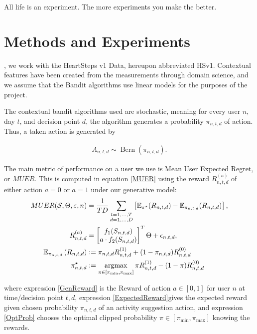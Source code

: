 \begin{savequote}[75mm]
All life is an experiment.  The more experiments you make the better.
\end{savequote}

\chapter{Methods and Experiments}
\label{Methods}

, we work with the HeartSteps v1 Data, hereupon abbreviated HSv1.  Contextual features have been created from the measurements through domain science, and we assume that the Bandit algorithms use linear models for the purposes of the project.

The contextual bandit algorithms used are stochastic, meaning for every user $n$, day $t$, and decision point $d$, the algorithm generates a probability $\pi_{n,t,d}$ of action.  Thus, a taken action is generated by

\begin{align*}
A_{n,t,d} \sim \operatorname{Bern}(\pi_{n,t,d}).
\end{align*}

The main metric of performance on a user we use is Mean User Expected Regret, or $MUER$. This is computed in equation \ref{MUER} using the reward $R^{(a)}_{n,t,d}$ of either action $a = 0$ or $a = 1$ under our generative model:
\begin{align}
\label{MUER}
MUER(\mathcal{S}, \Theta, \varepsilon,n) &= \frac{1}{TD} \sum_{\substack{t=1,\ldots,T \\ d=1,\ldots,D}} \left[\mathbb{E}_{\pi^\star} (R_{n,t,d}) - \mathbb{E}_{\pi_{n,t,d}} (R_{n,t,d}) \right],  \\
\label{GenReward}
R^{(a)}_{n,t,d} &= \begin{bmatrix} f_1(S_{n,t,d}) \\
a \cdot f_2(S_{n,t,d})
\end{bmatrix}^T \Theta + \epsilon_{n,t,d},  \\
\label{ExpectedReward}
\mathbb{E}_{\pi_{n,t,d}}\left(R_{n,t,d}\right) &:= \pi_{n,t,d} R^{(1)}_{n,t,d} + (1-\pi_{n,t,d}) R^{(0)}_{n,t,d} \\
\label{OptProb}
\pi^{\star}_{n,t,d} &:= \argmax_{\pi \in [\pi_{\text{min}},\pi_\text{max}]} \pi R_{n,t,d}^{(1)} - (1 -\pi) R_{n,t,d}^{(0)}
\end{align}

where expression \ref{GenReward} is the Reward of action $a \in [0,1]$ for user $n$ at time/decision point $t,d$, expression \ref{ExpectedReward}gives the expected reward given chosen probability $\pi_{n,t,d}$ of an activity suggestion action, and expression \ref{OptProb} chooses the optimal clipped probability $\pi \in [\pi_\text{min},\pi_\text{max}]$ knowing the rewards.

